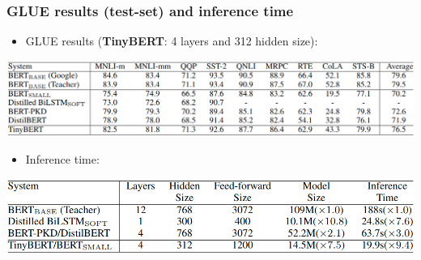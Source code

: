 \documentclass{beamer}
\begin{document}
\begin{frame}
    \frametitle{GLUE results (test-set) and inference time}
    \begin{itemize}
      \item GLUE results (\textbf{TinyBERT}: 4 layers and 312 hidden size):
    \end{itemize}
    \begin{center}
        \includegraphics[scale=0.3]{img/tiny_bert_glue.png}
    \end{center}
    \begin{itemize}
      \item Inference time:
    \end{itemize}
    \begin{center}
        \includegraphics[scale=0.34]{img/tiny_bert_inference_time.png}
    \end{center}
\end{frame}
\end{document}
